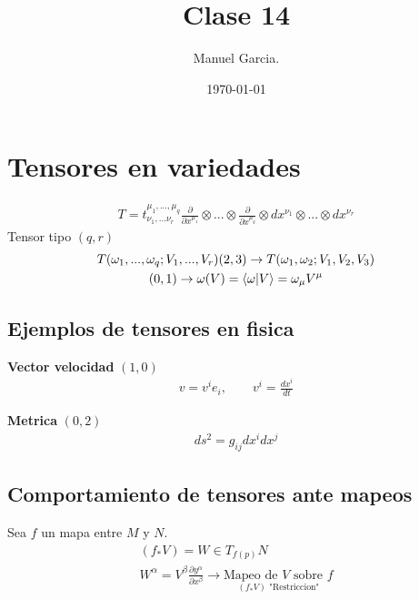 \documentclass{article}
\title{Clase 14}
\author{Manuel Garcia.}
\date{\today}
\begin{document}
\maketitle

\section{Tensores en variedades}
\begin{gather*}
  T = t ^ {\mu_1,...,\mu_q } _{\nu_1,... \nu_r} \frac{\partial  }{\partial x ^ {\mu_1 }} \otimes ... \otimes \frac{\partial  }{\partial x ^ {\mu_q }} \otimes dx ^ {\nu _1 } \otimes ...\otimes dx ^ {\nu_r }
\end{gather*}
Tensor tipo $ (q,r ) $ 
\begin{gather*}
  T(\omega_1,...,\omega_q; V_1,..., V_r )
  (2,3) \rightarrow T(\omega_1 , \omega_2; V_1,V_2,V_3)\\
  (0,1) \rightarrow \omega (V) = \bra{\omega }\ket{V } = \omega_\mu V ^ {\mu} 
\end{gather*}

\subsection{Ejemplos de tensores en fisica}

\textbf{Vector velocidad} $ (1,0 ) $
\begin{gather*}
  v = v ^ {i } e _i, \qquad v ^ {i } = \frac{d x ^ {i } }{d t }
\end{gather*}

\textbf{Metrica } $ (0,2 ) $
\begin{gather*}
  ds ^2 = g _{ij } dx ^ {i } dx ^ {j } 
\end{gather*}

\subsection{Comportamiento de tensores ante mapeos }
Sea $ f  $ un mapa entre $ M  $ y $ N  $.
\begin{gather*}
  (f_* V) = W \in T _{f(p)} N\\
  W ^ {\alpha } = V ^ {\beta } \frac{\partial y ^ {\alpha } }{\partial x ^ {\beta}} \rightarrow \underset{(f_* V) \text{ "Restriccion"}}{\text{Mapeo de } V \text{ sobre }f}\\
\end{gather*}
\end{document}
